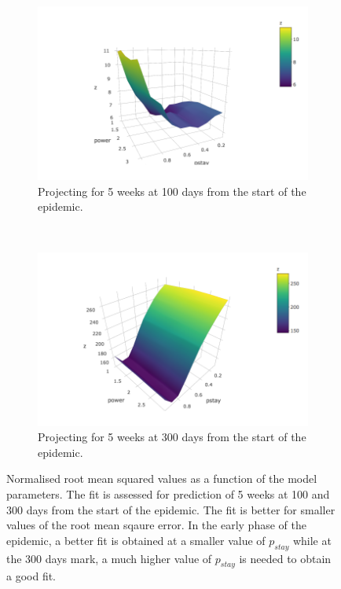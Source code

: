 \documentclass[11pt,]{article}
\begin{document}
\begin{figure}
  \centering
  \begin{subfigure}[b]{0.4\textwidth}
    \includegraphics[]{ms6-figures/rms-100-2}
    \caption{Projecting for 5 weeks at 100 days from the start of the epidemic.}
    \label{fig:rms-100}
\end{subfigure}
~
  \begin{subfigure}[b]{0.4\textwidth}
    \includegraphics[]{ms6-figures/rms-300-2}
    \caption{Projecting for 5 weeks at 300 days from the start of the epidemic.}    
    \label{fig:rms-300}
\end{subfigure}
  \caption[RMS as a function of model parameters]{Normalised root mean
    squared values as a function of the model parameters. The fit is
    assessed for prediction of 5 weeks at 100 and 300 days from the start of
    the epidemic. The fit is better for smaller values of the root
    mean sqaure error. In the early phase of the epidemic, a better
    fit is obtained at a smaller value of $p_{stay}$ while at the 300
    days mark, a much higher value of $p_{stay}$ is needed to obtain a
  good fit.}
  \label{fig:rms}
\end{figure}
\end{document}
